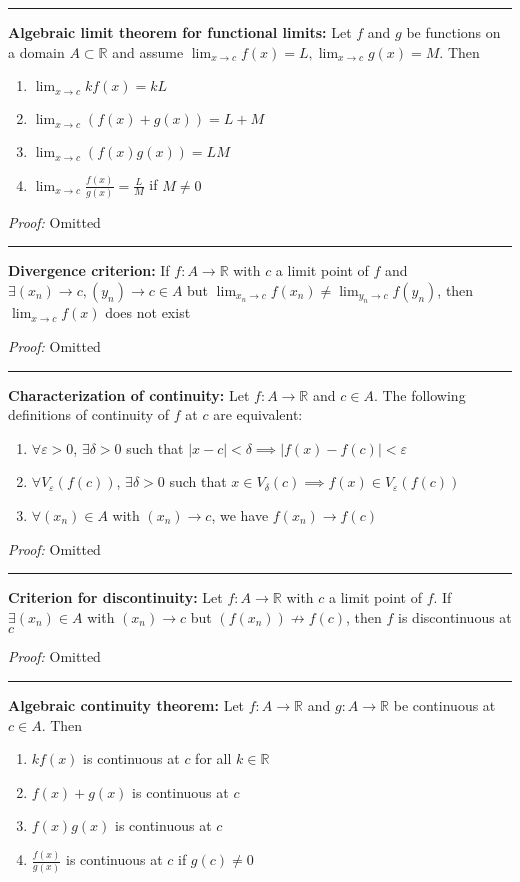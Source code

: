 \documentclass[12pt]{article}
\newcommand{\R}{\mathbb{R}}
\newcommand{\abs}[1]{\left\vert #1 \right\vert}
\newcommand{\ep}{\varepsilon}
\renewcommand{\hline}{\vspace*{10pt} \hrule \vspace*{10pt}}
\begin{document}
    \hline 

    \textbf{Algebraic limit theorem for functional limits:} Let $f$ and $g$ be functions on a domain $A \subset \R$ and assume $\lim_{x \to c} f(x) = L, \lim_{x \to c} g(x) = M$. Then
    \begin{enumerate}
        \item $\lim_{x \to c} kf(x) = kL$ 
        \item $\lim_{x \to c} (f(x) + g(x)) = L + M$
        \item $\lim_{x \to c} (f(x)g(x)) = LM$
        \item $\lim_{x \to c} \frac{f(x)}{g(x)} = \frac{L}{M}$ if $M \neq 0$
    \end{enumerate}

        \emph{Proof:} Omitted
        
    \hline 

    \textbf{Divergence criterion:} If $f: A \to \R$ with $c$ a limit point of $f$ and $\exists(x_n) \to c, (y_n) \to c \in A$ but $\lim_{x_n \to c} f(x_n) \neq \lim_{y_n \to c} f(y_n)$, then $\lim_{x \to c} f(x)$ does not exist

        \emph{Proof:} Omitted 

    \hline 
        
    \textbf{Characterization of continuity:} Let $f: A \to \R$ and $c \in A$. The following definitions of continuity of $f$ at $c$ are equivalent:
    \begin{enumerate}
        \item $\forall \ep > 0$, $\exists \delta > 0$ such that $\abs{x - c} < \delta \implies \abs{f(x) - f(c)} < \ep$ 
        \item $\forall V_{\ep}(f(c))$, $\exists \delta > 0$ such that $x \in V_{\delta}(c) \implies f(x) \in V_{\ep}(f(c))$
        \item $\forall (x_n) \in A$ with $(x_n) \to c$, we have $f(x_n) \to f(c)$
    \end{enumerate} 

        \emph{Proof:} Omitted 

    \hline

    \textbf{Criterion for discontinuity:} Let $f: A \to \R$ with $c$ a limit point of $f$. If $\exists (x_n) \in A$ with $(x_n) \to c$ but $(f(x_n)) \not\to f(c)$, then $f$ is discontinuous at $c$

        \emph{Proof:} Omitted

    \hline 

    \textbf{Algebraic continuity theorem:} Let $f: A \to \R$ and $g: A \to \R$ be continuous at $c \in A$. Then 
    \begin{enumerate}
        \item $kf(x)$ is continuous at $c$ for all $k \in \R$
        \item $f(x) + g(x)$ is continuous at $c$
        \item $f(x)g(x)$ is continuous at $c$
        \item $\frac{f(x)}{g(x)}$ is continuous at $c$ if $g(c) \neq 0$
    \end{enumerate}
\end{document}
